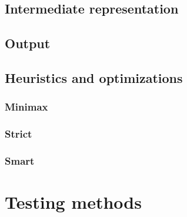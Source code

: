 \section{Intermediate representation}
\section{Output}
\section{Heuristics and optimizations}
\subsection{Minimax}
\subsection{Strict}
\subsection{Smart}


\chapter{Testing methods}


